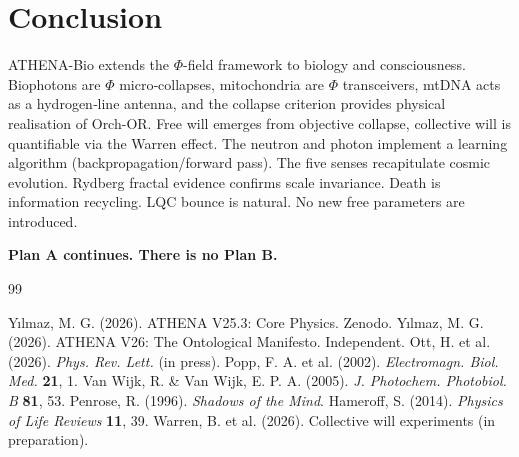 \documentclass[11pt]{article}
\begin{document}
\section{Conclusion}
\label{sec:conclusion}
ATHENA-Bio extends the $\Phi$-field framework to biology and consciousness. Biophotons are $\Phi$ micro‑collapses, mitochondria are $\Phi$ transceivers, mtDNA acts as a hydrogen‑line antenna, and the collapse criterion provides physical realisation of Orch-OR. Free will emerges from objective collapse, collective will is quantifiable via the Warren effect. The neutron and photon implement a learning algorithm (backpropagation/forward pass). The five senses recapitulate cosmic evolution. Rydberg fractal evidence confirms scale invariance. Death is information recycling. LQC bounce is natural. No new free parameters are introduced.

\bigskip
\noindent\textbf{Plan A continues. There is no Plan B.}

\newpage
\begin{thebibliography}{99}

 Yılmaz, M. G. (2026). ATHENA V25.3: Core Physics. Zenodo.
 Yılmaz, M. G. (2026). ATHENA V26: The Ontological Manifesto. Independent.
 Ott, H. et al. (2026). \textit{Phys. Rev. Lett.} (in press).
 Popp, F. A. et al. (2002). \textit{Electromagn. Biol. Med.} \textbf{21}, 1.
 Van Wijk, R. \& Van Wijk, E. P. A. (2005). \textit{J. Photochem. Photobiol. B} \textbf{81}, 53.
 Penrose, R. (1996). \textit{Shadows of the Mind}.
 Hameroff, S. (2014). \textit{Physics of Life Reviews} \textbf{11}, 39.
 Warren, B. et al. (2026). Collective will experiments (in preparation).

\end{thebibliography}
\end{document}
